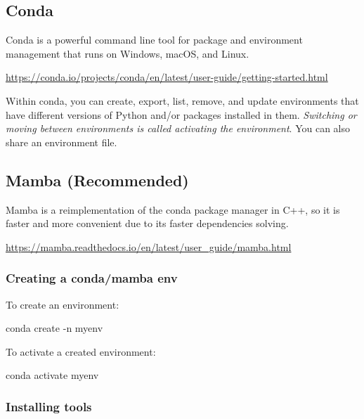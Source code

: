 \documentclass[
]{book}
\newenvironment{Shaded}{\begin{snugshade}}{\end{snugshade}}
\newcommand{\AttributeTok}[1]{\textcolor[rgb]{0.13,0.29,0.53}{#1}}
\newcommand{\ExtensionTok}[1]{#1}
\newcommand{\NormalTok}[1]{#1}
\begin{document}
\subsection{Conda}\label{conda}

Conda is a powerful command line tool for package and environment management that runs on Windows, macOS, and Linux.

\url{https://conda.io/projects/conda/en/latest/user-guide/getting-started.html}

Within conda, you can create, export, list, remove, and update environments that have different versions of Python and/or packages installed in them. \emph{Switching or moving between environments is called activating the environment}. You can also share an environment file.

\subsection{Mamba (Recommended)}\label{mamba-recommended}

Mamba is a reimplementation of the conda package manager in C++, so it is faster and more convenient due to its faster dependencies solving.

\url{https://mamba.readthedocs.io/en/latest/user_guide/mamba.html}

\subsubsection{Creating a conda/mamba env}\label{creating-a-condamamba-env}

To create an environment:

\begin{Shaded}
\begin{Highlighting}[]
\ExtensionTok{conda}\NormalTok{ create }\AttributeTok{{-}n}\NormalTok{ myenv}
\end{Highlighting}
\end{Shaded}

To activate a created environment:

\begin{Shaded}
\begin{Highlighting}[]
\ExtensionTok{conda}\NormalTok{ activate myenv}
\end{Highlighting}
\end{Shaded}

\subsubsection{Installing tools}\label{installing-tools}
\end{document}
